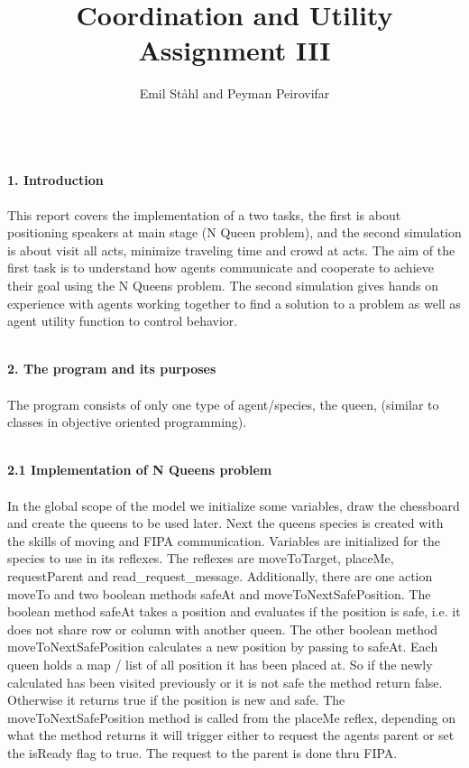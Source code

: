 \documentclass[a4paper,10pt]{article}
\title{\textbf{Coordination and Utility} \\ 
\textbf{Assignment III}}
\author{Emil Ståhl and Peyman Peirovifar}
\begin{document}
\maketitle
\textbf
{\\1. Introduction\\\\}
This report covers the implementation of a two tasks, the first is about positioning speakers at main stage (N Queen problem), and the second simulation is about visit all acts, minimize traveling time and crowd at acts. The aim of the first task is to understand how agents communicate and cooperate to achieve their goal using the N Queens problem. The second simulation gives hands on experience with agents working together to find a solution to a problem as well as agent utility function to control behavior. 

\maketitle
\textbf
{\\2. The program and its purposes\\\\}
The program consists of only one type of agent/species, the queen, (similar to classes in objective oriented programming).

\maketitle
\textbf
{\\2.1 Implementation of N Queens problem\\\\}
In the global scope of the model we initialize some variables, draw the chessboard and create the queens to be used later. Next the queens species is created with the skills of moving and FIPA communication. Variables are initialized for the species to use in its reflexes. The reflexes are moveToTarget, placeMe, requestParent and read\_request\_message. Additionally, there are one action moveTo and two boolean methods safeAt and moveToNextSafePosition.
The boolean method safeAt takes a position and evaluates if the position is safe, i.e. it does not share row or column with another queen. The other boolean method moveToNextSafePosition calculates a new position by passing to safeAt. Each queen holds a map / list of all position it has been placed at. So if the newly calculated has been visited previously or it is not safe the method return false. Otherwise it returns true if the position is new and safe.
The moveToNextSafePosition method is called from the placeMe reflex, depending on what the method returns it will trigger either to request the agents parent or set the isReady flag to true. The request to the parent is done thru FIPA. 
\end{document}
